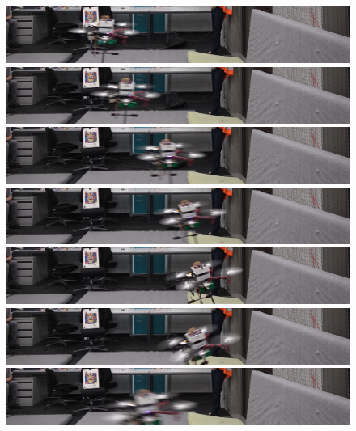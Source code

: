 \begin{figure}
	\centering
	\includegraphics[width=0.9\linewidth]{pictures/av1.png}
	\includegraphics[width=0.9\linewidth]{pictures/av2.png}
	\includegraphics[width=0.9\linewidth]{pictures/av3.png}
	\includegraphics[width=0.9\linewidth]{pictures/av4.png}
	\includegraphics[width=0.9\linewidth]{pictures/av5.png}
	\includegraphics[width=0.9\linewidth]{pictures/av6.png}
	\includegraphics[width=0.9\linewidth]{pictures/av7.png}	
	\caption{}
	\label{fig:maneuvre}
\end{figure}

